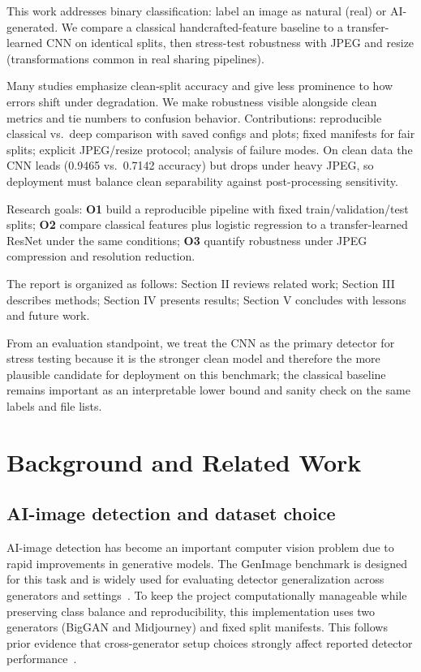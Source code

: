 \documentclass[conference]{IEEEtran}
\begin{document}
This work addresses binary classification: label an image as natural (real) or AI-generated. We compare a classical handcrafted-feature baseline to a transfer-learned CNN on identical splits, then stress-test robustness with JPEG and resize (transformations common in real sharing pipelines).

Many studies emphasize clean-split accuracy and give less prominence to how errors shift under degradation. We make robustness visible alongside clean metrics and tie numbers to confusion behavior. Contributions: reproducible classical vs.\ deep comparison with saved configs and plots; fixed manifests for fair splits; explicit JPEG/resize protocol; analysis of failure modes. On clean data the CNN leads (0.9465 vs.\ 0.7142 accuracy) but drops under heavy JPEG, so deployment must balance clean separability against post-processing sensitivity.

Research goals: \textbf{O1} build a reproducible pipeline with fixed train/validation/test splits; \textbf{O2} compare classical features plus logistic regression to a transfer-learned ResNet under the same conditions; \textbf{O3} quantify robustness under JPEG compression and resolution reduction.

The report is organized as follows: Section II reviews related work; Section III describes methods; Section IV presents results; Section V concludes with lessons and future work.

From an evaluation standpoint, we treat the CNN as the primary detector for stress testing because it is the stronger clean model and therefore the more plausible candidate for deployment on this benchmark; the classical baseline remains important as an interpretable lower bound and sanity check on the same labels and file lists.

\section{Background and Related Work}
\subsection{AI-image detection and dataset choice}
AI-image detection has become an important computer vision problem due to rapid improvements in generative models. The GenImage benchmark is designed for this task and is widely used for evaluating detector generalization across generators and settings~\cite{zhu2023genimage}. To keep the project computationally manageable while preserving class balance and reproducibility, this implementation uses two generators (BigGAN and Midjourney) and fixed split manifests. This follows prior evidence that cross-generator setup choices strongly affect reported detector performance~\cite{zhu2023genimage,ojha2023universal}.
\end{document}
